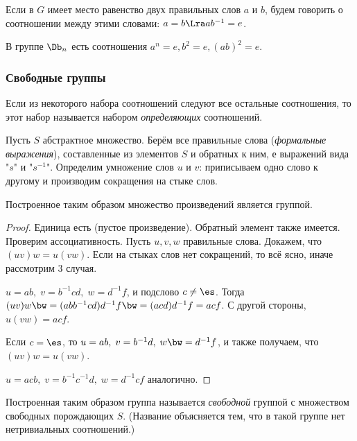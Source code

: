 \documentclass[a4paper]{article}
\begin{document}
\begin{df}
Если в $G$ имеет место равенство двух правильных слов $a$ и $b$, будем говорить о соотношении между этими
словами: $a=b \Lra ab^{-1}=e$.
\end{df}

\begin{ex}
В группе $\Db_n$ есть соотношения $a^n=e, b^2=e, (ab)^2=e$.
\end{ex}

\subsubsection{Свободные группы}

\begin{df}
Если из некоторого набора соотношений следуют все остальные соотношения, то этот набор называется набором
\emph{определяющих} соотношений.
\end{df}

Пусть $S$ абстрактное множество. Берём все правильные слова (\emph{формальные выражения}), составленные
из элементов $S$ и обратных к ним, е выражений вида "$s$"\; и "$s^{-1}$". Определим умножение слов $u$ и
$v$: приписываем одно слово к другому и производим сокращения на стыке слов.

\begin{stm}
Построенное таким образом множество произведений является группой.
\end{stm}
\begin{proof}
Единица есть (пустое произведение). Обратный элемент также имеется. Проверим ассоциативность.  Пусть
$u,v,w$ правильные слова. Докажем, что $(uv)w=u(vw)$. Если на стыках слов нет сокращений, то всё ясно,
иначе рассмотрим 3 случая.

 $u=ab, \; v=b^{-1}cd, \; w=d^{-1}f$, и подслово $c \neq \es$. Тогда $(uv)w \bw= (abb^{-1}cd)d^{-1}f \bw= (acd)d^{-1}f = acf$.
С другой стороны, $u(vw) = acf$.

 Если $c=\es$, то $u=ab, \; v=b^{-1}d, \; w \bw= d^{-1}f$, и также получаем, что $(uv)w=u(vw)$.

 $u=acb, \; v=b^{-1}c^{-1}d, \; w=d^{-1}cf$ аналогично.
\end{proof}

\begin{df}
Построенная таким образом группа называется \emph{свободной} группой с множеством свободных  порождающих
$S$. (Название объясняется тем, что в такой группе нет нетривиальных соотношений.)
\end{df}
\end{document}

